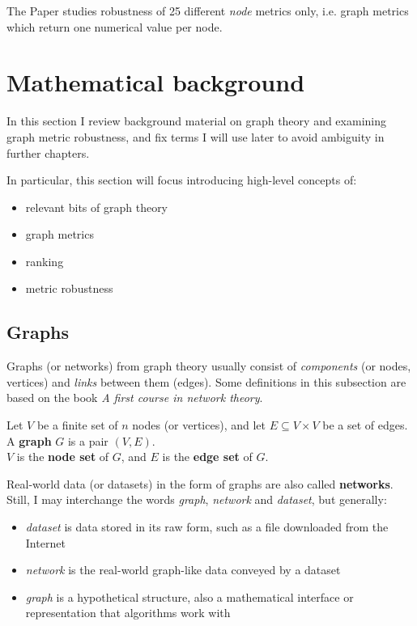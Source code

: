 The Paper studies robustness of 25 different \textsl{node} metrics only, i.e. graph metrics which return one numerical value per node.


\section{Mathematical background}

In this section I review background material on graph theory and examining graph metric robustness, and fix terms I will use later to avoid ambiguity in further chapters.

In particular, this section will focus introducing high-level concepts of:
\begin{itemize}
    \item relevant bits of graph theory
    \item graph metrics
    \item ranking
    \item metric robustness
\end{itemize}

\subsection{Graphs}

Graphs (or networks) from graph theory usually consist of \textit{components} (or nodes, vertices) and \textit{links} between them (edges).
Some definitions in this subsection are based on the book \textsl{A first course in network theory}\cite{Estrada2017}.

\begin{definition}[Graph]
    Let $V$ be a finite set of $n$ nodes (or vertices), and let $E \subseteq V \times V$ be a set of edges.\\
    A \textbf{graph} $G$ is a pair $(V, E)$.\\
    $V$ is the \textbf{node set} of $G$, and $E$ is the \textbf{edge set} of $G$.
\end{definition}

Real-world data (or datasets) in the form of graphs are also called \textbf{networks}.
Still, I may interchange the words \textsl{graph}, \textsl{network} and \textsl{dataset}, but generally:
\begin{itemize}
    \item \textsl{dataset} is data stored in its raw form, such as a file downloaded from the Internet
    \item \textsl{network} is the real-world graph-like data conveyed by a dataset
    \item \textsl{graph} is a hypothetical structure, also a mathematical interface or representation that algorithms work with
\end{itemize}

